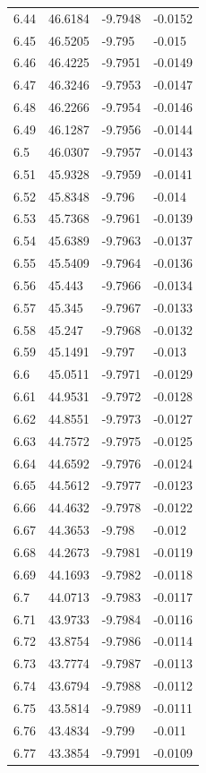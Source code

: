 \begin{tabular}{llll}
6.44 & 46.6184 & -9.7948 & -0.0152 \\
6.45 & 46.5205 & -9.795 & -0.015 \\
6.46 & 46.4225 & -9.7951 & -0.0149 \\
6.47 & 46.3246 & -9.7953 & -0.0147 \\
6.48 & 46.2266 & -9.7954 & -0.0146 \\
6.49 & 46.1287 & -9.7956 & -0.0144 \\
6.5 & 46.0307 & -9.7957 & -0.0143 \\
6.51 & 45.9328 & -9.7959 & -0.0141 \\
6.52 & 45.8348 & -9.796 & -0.014 \\
6.53 & 45.7368 & -9.7961 & -0.0139 \\
6.54 & 45.6389 & -9.7963 & -0.0137 \\
6.55 & 45.5409 & -9.7964 & -0.0136 \\
6.56 & 45.443 & -9.7966 & -0.0134 \\
6.57 & 45.345 & -9.7967 & -0.0133 \\
6.58 & 45.247 & -9.7968 & -0.0132 \\
6.59 & 45.1491 & -9.797 & -0.013 \\
6.6 & 45.0511 & -9.7971 & -0.0129 \\
6.61 & 44.9531 & -9.7972 & -0.0128 \\
6.62 & 44.8551 & -9.7973 & -0.0127 \\
6.63 & 44.7572 & -9.7975 & -0.0125 \\
6.64 & 44.6592 & -9.7976 & -0.0124 \\
6.65 & 44.5612 & -9.7977 & -0.0123 \\
6.66 & 44.4632 & -9.7978 & -0.0122 \\
6.67 & 44.3653 & -9.798 & -0.012 \\
6.68 & 44.2673 & -9.7981 & -0.0119 \\
6.69 & 44.1693 & -9.7982 & -0.0118 \\
6.7 & 44.0713 & -9.7983 & -0.0117 \\
6.71 & 43.9733 & -9.7984 & -0.0116 \\
6.72 & 43.8754 & -9.7986 & -0.0114 \\
6.73 & 43.7774 & -9.7987 & -0.0113 \\
6.74 & 43.6794 & -9.7988 & -0.0112 \\
6.75 & 43.5814 & -9.7989 & -0.0111 \\
6.76 & 43.4834 & -9.799 & -0.011 \\
6.77 & 43.3854 & -9.7991 & -0.0109 \\

\end{tabular}
